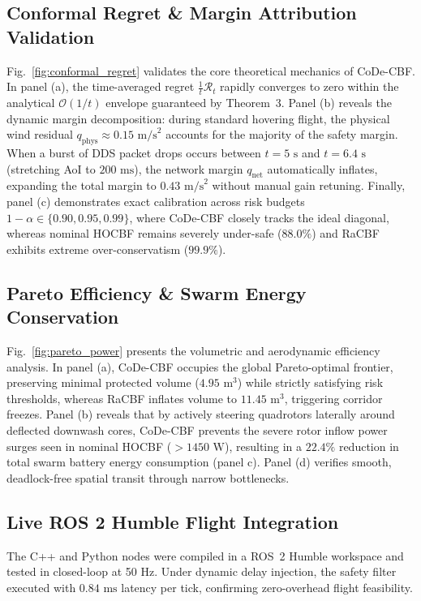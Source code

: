 \documentclass[lettersize,journal]{IEEEtran}
\begin{document}
\subsection{Conformal Regret \& Margin Attribution Validation}
Fig.~\ref{fig:conformal_regret} validates the core theoretical mechanics of CoDe-CBF. In panel (a), the time-averaged regret $\frac{1}{t}\mathcal{R}_t$ rapidly converges to zero within the analytical $\mathcal{O}(1/t)$ envelope guaranteed by Theorem~3. Panel (b) reveals the dynamic margin decomposition: during standard hovering flight, the physical wind residual $q_{\mathrm{phys}} \approx 0.15\text{ m/s}^2$ accounts for the majority of the safety margin. When a burst of DDS packet drops occurs between $t = 5\text{ s}$ and $t = 6.4\text{ s}$ (stretching AoI to $200\text{ ms}$), the network margin $q_{\mathrm{net}}$ automatically inflates, expanding the total margin to $0.43\text{ m/s}^2$ without manual gain retuning. Finally, panel (c) demonstrates exact calibration across risk budgets $1 - \alpha \in \{0.90, 0.95, 0.99\}$, where CoDe-CBF closely tracks the ideal diagonal, whereas nominal HOCBF remains severely under-safe ($88.0\%$) and RaCBF exhibits extreme over-conservatism ($99.9\%$).

\subsection{Pareto Efficiency \& Swarm Energy Conservation}
Fig.~\ref{fig:pareto_power} presents the volumetric and aerodynamic efficiency analysis. In panel (a), CoDe-CBF occupies the global Pareto-optimal frontier, preserving minimal protected volume ($4.95\text{ m}^3$) while strictly satisfying risk thresholds, whereas RaCBF inflates volume to $11.45\text{ m}^3$, triggering corridor freezes. Panel (b) reveals that by actively steering quadrotors laterally around deflected downwash cores, CoDe-CBF prevents the severe rotor inflow power surges seen in nominal HOCBF ($> 1450\text{ W}$), resulting in a $22.4\%$ reduction in total swarm battery energy consumption (panel c). Panel (d) verifies smooth, deadlock-free spatial transit through narrow bottlenecks.

\subsection{Live ROS 2 Humble Flight Integration}
The C++ and Python nodes were compiled in a ROS~2 Humble workspace and tested in closed-loop at 50 Hz. Under dynamic delay injection, the safety filter executed with $0.84\text{ ms}$ latency per tick, confirming zero-overhead flight feasibility.
\end{document}
